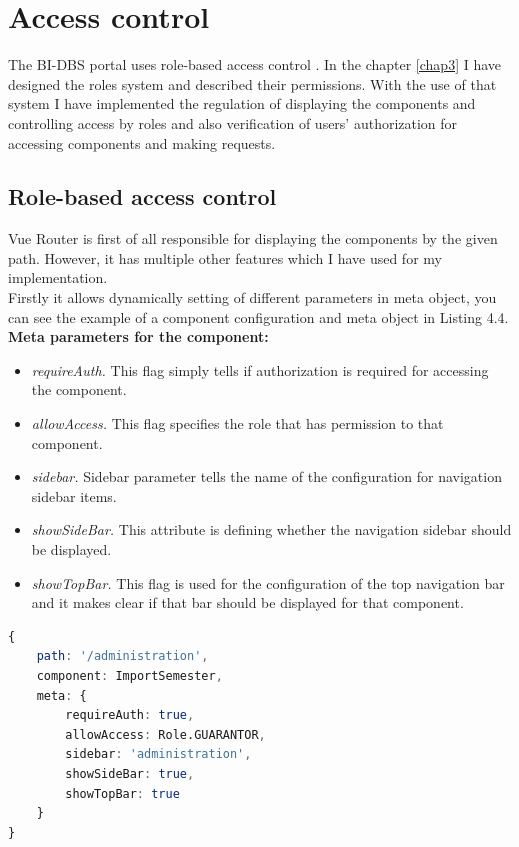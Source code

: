 \section{Access control} The BI-DBS portal uses role-based access control \cite{role-auth}. In the chapter \ref{chap3} I have designed the roles system and described their permissions. With the use of that system I have implemented the regulation of displaying the components and controlling access by roles and also verification of users' authorization for accessing components and making requests.

\subsection{Role-based access control}\label{role-impl} Vue Router is first of all responsible for displaying the components by the given path. However, it has multiple other features which I have used for my implementation.\\
Firstly it allows dynamically setting of different parameters in meta object, you can see the example of a component configuration and meta object in Listing 4.4.\\

\noindent \textbf{Meta parameters for the component:}

\begin{itemize}
    \item \emph{requireAuth.} This flag simply tells if authorization is required for accessing the component.
    \item \emph{allowAccess.} This flag specifies the role that has permission to that component.
    \item \emph{sidebar.} Sidebar parameter tells the name of the configuration for navigation sidebar items.
    \item \emph{showSideBar.} This attribute is defining whether the navigation sidebar should be displayed.
    \item \emph{showTopBar.} This flag is used for the configuration of the top navigation bar and it makes clear if that bar should be displayed for that component.
\end{itemize}

\begin{lstlisting}[language=Octave, caption=The example of component configuration in Router]
{
    path: '/administration',
    component: ImportSemester,
    meta: {
        requireAuth: true,
        allowAccess: Role.GUARANTOR,
        sidebar: 'administration',
        showSideBar: true,
        showTopBar: true
    }
}
\end{lstlisting}

